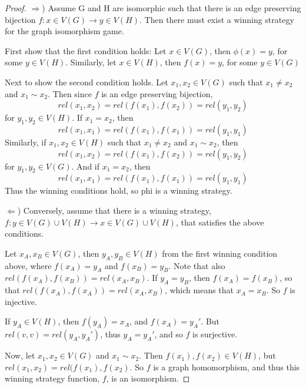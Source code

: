 \documentclass[12pt]{article}
\begin{document}
\begin{proof}
$\Rightarrow$) Assume G and H are isomorphic such that there is an edge preserving bijection $f: x \in V(G) \to y \in V(H)$. Then there must exist a winning strategy for the graph isomorphism game. 

First show that the first condition holds: Let $x \in V(G)$, then $\phi(x) = y$, for some $y \in V(H)$. Similarly, let $x \in V(H)$, then $f(x) = y$, for some $y \in V(G)$

Next to show the second condition holds. Let $x_1, x_2 \in V(G)$ such that $x_1 \neq x_2$ and $x_1 \sim x_2$. Then since $f$ is an edge preserving bijection, 
\begin{equation}
rel(x_1, x_2) = rel(f(x_1), f(x_2)) = rel(y_1, y_2)
\end{equation}
for $y_1, y_2 \in V(H)$. If $x_1 = x_2$, then 
\begin{equation}
rel(x_1, x_1) = rel(f(x_1), f(x_1)) = rel(y_1, y_1)
\end{equation}
Similarly, if $x_1, x_2 \in V(H)$ such that $x_1 \neq x_2$ and $x_1 \sim x_2$, then  
\begin{equation}
rel(x_1, x_2) = rel(f(x_1), f(x_2)) = rel(y_1, y_2)
\end{equation}
for $y_1, y_2 \in V(G)$. And if $x_1 = x_2$, then 
\begin{equation}
rel(x_1, x_1) = rel(f(x_1), f(x_1)) = rel(y_1, y_1)
\end{equation}
Thus the winning conditions hold, so phi is a winning strategy.

$\Leftarrow$) Conversely, assume that there is a winning strategy, $f: y \in V(G)\cup V(H) \to x \in V(G) \cup V(H)$, that satisfies the above conditions. 

Let $x_A, x_B \in V(G)$, then $y_A, y_B \in V(H)$ from the first winning condition above, where $f(x_A) = y_A$ and $f(x_B) = y_B$. Note that also $rel(f(x_A), f(x_B)) = rel(x_A, x_B)$. If $y_A = y_B$, then $f(x_A) = f(x_B)$, so that $rel(f(x_A), f(x_A)) = rel(x_A, x_B)$, which means that $x_A = x_B$. So $f$ is injective. 

If $y_A \in V(H)$, then $f(y_A) = x_A$, and $f(x_A) = y_A'$. But $rel(v, v) = rel(y_A, y_A')$, thus $y_A = y_A'$, and so $f$ is surjective. 

Now, let $x_1, x_2 \in V(G)$ and $x_1 \sim x_2$. Then $f(x_1), f(x_2) \in V(H)$, but $rel(x_1, x_2) = rel(f(x_1), f(x_2)$. So $f$ is a  graph homomorphism, and thus this winning strategy function, $f$, is an isomorphism.

\end{proof}
\end{document}
